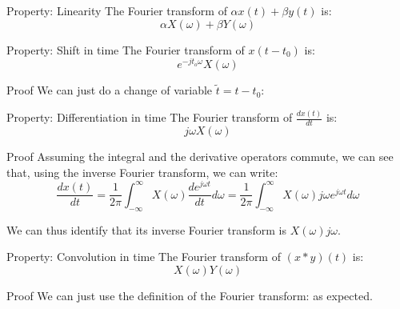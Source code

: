 \documentclass[a4paper]{article}
\begin{document}
\begin{parag}{Property: Linearity}
    The Fourier transform of $\alpha x\left(t\right) + \beta y\left(t\right)$ is: 
    \[\alpha X\left(\omega\right) + \beta Y\left(\omega\right)\]
\end{parag}

\begin{parag}{Property: Shift in time}
    The Fourier transform of $x\left(t - t_0\right)$ is: 
    \[e^{-j t_o \omega} X\left(\omega\right)\]

    \begin{subparag}{Proof}
        We can just do a change of variable $\widetilde{t} = t - t_0$: 
    \end{subparag}
\end{parag}

\begin{parag}{Property: Differentiation in time}
    The Fourier transform of $\frac{dx\left(t\right)}{dt}$ is: 
    \[j \omega X\left(\omega\right)\]

    \begin{subparag}{Proof}
        Assuming the integral and the derivative operators commute, we can see that, using the inverse Fourier transform, we can write:
        \[\frac{dx\left(t\right)}{dt} = \frac{1}{2\pi} \int_{-\infty}^{\infty} X\left(\omega\right) \frac{d e^{j \omega t}}{dt} d \omega = \frac{1}{2 \pi} \int_{-\infty}^{\infty} X\left(\omega\right) j\omega e^{j \omega t} d\omega\]

        We can thus identify that its inverse Fourier transform is $X\left(\omega\right) j\omega$.
    \end{subparag}
\end{parag}

\begin{parag}{Property: Convolution in time}
    The Fourier transform of $\left(x * y\right)\left(t\right)$ is: 
    \[X\left(\omega\right)Y\left(\omega\right)\]

    \begin{subparag}{Proof}
        We can just use the definition of the Fourier transform: 
        as expected.
    \end{subparag}
    
\end{parag}
\end{document}
